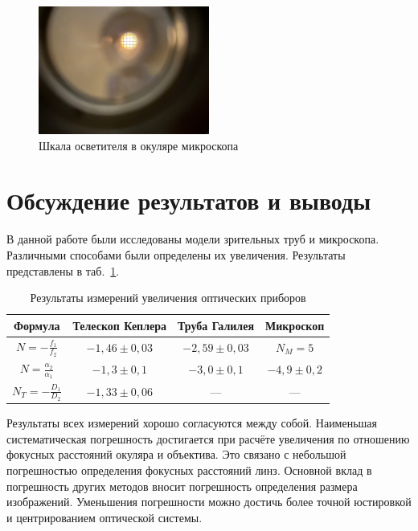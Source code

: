 \documentclass[a4paper, 12pt]{article}
\begin{document}
\begin{figure}[h!]
\begin{center}
    \includegraphics[width=0.5\textwidth]{micro_grid.jpg}
\end{center}
\caption{Шкала осветителя в окуляре микроскопа}
\label{fig:micro_grid}
\end{figure}

\section{Обсуждение результатов и выводы}

В данной работе были исследованы модели зрительных труб и микроскопа. Различными способами были определены их увеличения. Результаты представлены в таб.~\ref{tab:res}.

\begin{table}[h!]
\renewcommand{\arraystretch}{1.5}
\begin{center}
\begin{tabular}{|c|c|c|c|}
\hline
Формула   & Телескоп Кеплера            & Труба Галилея               & Микроскоп                 \\ \hline
$N = -\frac{f_1}{f_2}$     & $-1,46\pm0,03$ & $-2,59\pm0,03$ & $N_M = 5$                  \\ \hline
$N = \frac{\alpha_2}{\alpha_1}$     & $-1,3\pm0,1$  & $-3,0\pm0,1$   & $-4,9\pm0,2$ \\ \hline
$N_T = -\frac{D_1}{D_2}$ & $-1,33\pm0,06$ & ---                           & ---                         \\ \hline
\end{tabular}
\end{center}
\caption{Результаты измерений увеличения оптических приборов}
\label{tab:res}
\end{table}

Результаты всех измерений хорошо согласуются между собой. Наименьшая систематическая погрешность достигается при расчёте увеличения по отношению фокусных расстояний окуляра и объектива. Это связано с небольшой погрешностью определения фокусных расстояний линз. Основной вклад в погрешность других методов вносит погрешность определения размера изображений. Уменьшения погрешности можно достичь более точной юстировкой и центрированием оптической системы.
\end{document}
